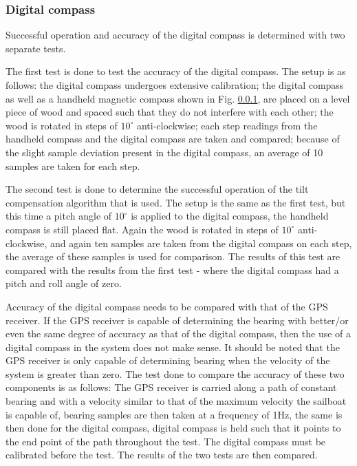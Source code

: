 \subsubsection{Digital compass}
Successful operation and accuracy of the digital compass is determined with two separate tests. 

The first test is done to test the accuracy of the digital 
compass. The setup is as follows: the digital compass undergoes extensive calibration; the digital compass as well as a handheld magnetic compass shown 
in Fig. \ref{}, are placed on a level piece of wood and 
spaced such that they do not interfere with each other; the wood is rotated in steps of $10^{\circ}$ anti-clockwise; each step readings from the handheld 
compass and the digital compass are taken and compared; because of the slight sample deviation present in the digital compass, an average of 10 samples
are taken for each step. 

The second test is done to determine the successful operation of the tilt compensation algorithm that is used. The 
setup is the same as the first test, but this time a pitch angle of $10^{\circ}$ is applied to the digital compass, the handheld compass is still placed 
flat. Again the wood is rotated in steps of $10^{\circ}$ anti-clockwise, and again ten samples are taken from the digital compass on each step, the average
of these samples is used for comparison. The results of this test are compared with the results from the first test - where the digital compass had a pitch 
and roll angle of zero. 

Accuracy of the digital compass needs to be compared with that of the GPS receiver. If the GPS receiver is capable of determining the bearing with better/or 
even the same degree of accuracy as that of the digital compass, then the use of a digital compass in the 
system does not make sense. It should be noted that the GPS receiver is only capable of determining bearing when the velocity of the system is greater than
zero. The test done to compare the accuracy of these two components is as follows: The GPS receiver is carried along a path of constant bearing and with a 
velocity similar to that of the maximum velocity the sailboat is capable of, bearing samples are then taken at a frequency of 1Hz, the same is then done 
for the digital compass, digital compass is held such that it points to the end point of the path throughout 
the test. The digital compass must be calibrated before the test. The results of the two tests are then compared.  

